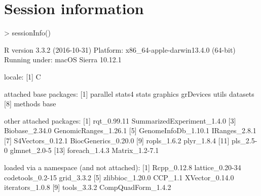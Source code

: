 \documentclass{article}
\begin{document}
\section{Session information}
\begin{Schunk}
\begin{Sinput}
> sessionInfo()
\end{Sinput}
\begin{Soutput}
R version 3.3.2 (2016-10-31)
Platform: x86_64-apple-darwin13.4.0 (64-bit)
Running under: macOS Sierra 10.12.1

locale:
[1] C

attached base packages:
[1] parallel  stats4    stats     graphics  grDevices utils     datasets 
[8] methods   base     

other attached packages:
 [1] rqt_0.99.11                SummarizedExperiment_1.4.0
 [3] Biobase_2.34.0             GenomicRanges_1.26.1      
 [5] GenomeInfoDb_1.10.1        IRanges_2.8.1             
 [7] S4Vectors_0.12.1           BiocGenerics_0.20.0       
 [9] ropls_1.6.2                plyr_1.8.4                
[11] pls_2.5-0                  glmnet_2.0-5              
[13] foreach_1.4.3              Matrix_1.2-7.1            

loaded via a namespace (and not attached):
 [1] Rcpp_0.12.8        lattice_0.20-34    codetools_0.2-15   grid_3.3.2        
 [5] zlibbioc_1.20.0    CCP_1.1            XVector_0.14.0     iterators_1.0.8   
 [9] tools_3.3.2        CompQuadForm_1.4.2
\end{Soutput}
\end{Schunk}
\end{document}
